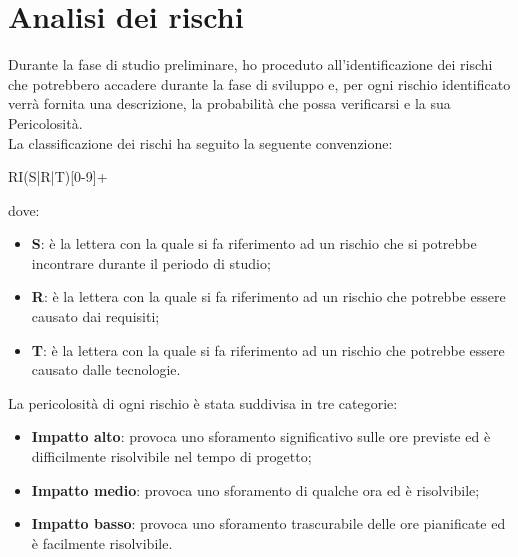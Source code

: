
\section{Analisi dei rischi}
Durante la fase di studio preliminare, ho proceduto all'identificazione dei rischi che potrebbero accadere durante la fase di sviluppo e, per ogni rischio identificato verrà fornita una descrizione, la probabilità che possa verificarsi e la sua Pericolosità. \\

\noindent La classificazione dei rischi ha seguito la seguente convenzione:
\begin{center}
  RI(S|R|T)[0-9]+
\end{center}
dove:
\begin{itemize}
  \item \textbf{S}: è la lettera con la quale si fa riferimento ad un rischio che si potrebbe incontrare durante il periodo di studio;
  \item \textbf{R}: è la lettera con la quale si fa riferimento ad un rischio che potrebbe essere causato dai requisiti;
  \item \textbf{T}: è la lettera con la quale si fa riferimento ad un rischio che potrebbe essere causato dalle tecnologie.
\end{itemize}

\noindent La pericolosità di ogni rischio è stata suddivisa in tre categorie:
\begin{itemize}
  \item \textbf{Impatto alto}: provoca uno sforamento significativo sulle ore previste ed è difficilmente risolvibile nel tempo di progetto;
  \item \textbf{Impatto medio}: provoca uno sforamento di qualche ora ed è risolvibile;
  \item \textbf{Impatto basso}: provoca uno sforamento trascurabile delle ore pianificate ed è facilmente risolvibile.
\end{itemize}


